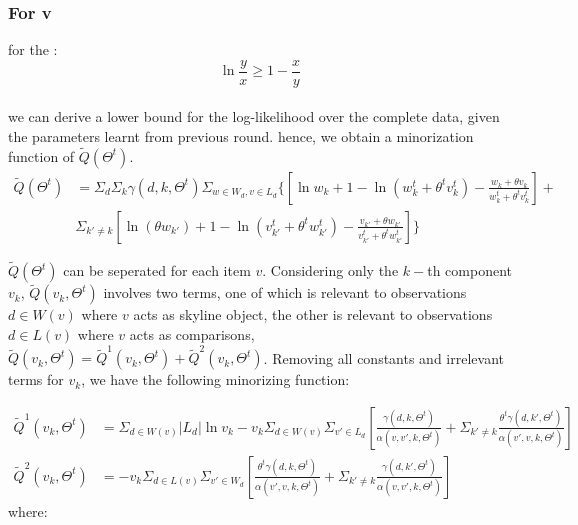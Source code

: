 \documentclass{article}
\begin{document}
\subsubsection{For v}
for the :
\begin{equation*}
\ln \frac{y}{x} \geq 1- \frac{x}{y}
\end{equation*}\\
we can derive a lower bound for the log-likelihood over the complete data, given the parameters learnt from previous round.
hence, we obtain a minorization function of $\tilde{Q}(\Theta^t)$.\\
\begin{equation}
\begin{aligned}
\tilde{Q}(\Theta^t) &= \Sigma_d \Sigma_k \gamma(d,k,\Theta^t) \Sigma_{w\in W_d, v\in L_d}  \{ [\ln w_k + 1 - \ln (w_k^t + \theta^t v_k^t) - \frac{w_k+\theta v_k}{w_k^t + \theta^tv_k^t}]+\\\nonumber
&\Sigma_{k'\neq k} [\ln (\theta w_{k'}) + 1 - \ln (v_{k'}^t + \theta^t w_{k'}^t) -  \frac{v_{k'}+\theta w_{k'}}{v_{k'}^t + \theta^t w_{k'}^t}]
\}
\end{aligned}
\end{equation}


 $\tilde{Q}(\Theta^t)$ can be seperated for each item $v$. Considering only the $k-$th component $v_k$, $\tilde{Q}(v_k,\Theta^t)$ involves two terms, one of which is relevant to observations $d\in W(v)$ where $v$ acts as skyline object, the other is relevant to observations $d \in L(v)$ where $v$ acts as comparisons, $\tilde{Q}(v_k,\Theta^t)=\tilde{Q}^1(v_k,\Theta^t)+\tilde{Q}^2(v_k,\Theta^t)$. Removing all constants and irrelevant terms for $v_k$, we have the following minorizing function:


\begin{equation}
\begin{aligned}
\tilde{Q}^1(v_k,\Theta^t) & = \Sigma_{d\in W(v)} |L_d| \ln v_k -v_k\Sigma_{d\in W(v)}\Sigma_{v'\in L_d} [\frac{\gamma(d,k,\Theta^t)}{ \alpha(v,v',k,\Theta^t)} +\Sigma_{k'\neq k}\frac{\theta^t\gamma(d,k',\Theta^t)}{\alpha(v',v,k,\Theta^t)}]\\ \nonumber
\tilde{Q}^2(v_k,\Theta^t) & = -v_k \Sigma_{d\in L(v)}\Sigma_{v'\in W_d} [\frac{\theta^t \gamma(d,k,\Theta^t)}{\alpha(v',v,k,\Theta^t)}+\Sigma_{k'\neq k} \frac{\gamma(d,k',\Theta^t)}{\alpha(v,v',k,\Theta^t)}]
\end{aligned}
\end{equation}
 where:\\
\end{document}
